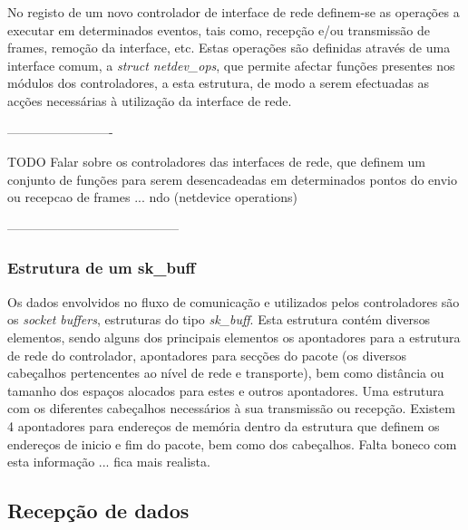 No registo de um novo controlador de interface de rede definem-se as operações a executar em determinados eventos, tais como, recepção e/ou transmissão de frames, remoção da interface, etc.
Estas operações são definidas através de uma interface comum, a \textit{struct netdev\_ops}, que permite afectar funções presentes nos módulos dos controladores, a esta estrutura, de modo a serem efectuadas as acções necessárias à utilização da interface de rede.

-------------------------

TODO
Falar sobre os controladores das interfaces de rede, que definem um conjunto de funções para serem desencadeadas em determinados pontos do envio ou recepcao de frames ... ndo (netdevice operations) 
 
-----------------------------------------

\subsubsection{Estrutura de um sk\_buff}
\label{subsub:sk_buff}

Os dados envolvidos no fluxo de comunicação e utilizados pelos controladores são os \textit{socket buffers}, estruturas do tipo \textit{sk\_buff}.
Esta estrutura contém diversos elementos, sendo alguns dos principais elementos os apontadores para a estrutura de rede do controlador, apontadores para secções do pacote (os diversos cabeçalhos pertencentes ao nível de rede e transporte), bem como distância ou tamanho dos espaços alocados para estes e outros apontadores.
Uma estrutura com os diferentes cabeçalhos necessários à sua transmissão ou recepção.
Existem 4 apontadores para endereços de memória dentro da estrutura que definem os endereços de inicio e fim do pacote, bem como dos cabeçalhos.
Falta boneco com esta informação ... fica mais realista.

\subsection{Recepção de dados}



